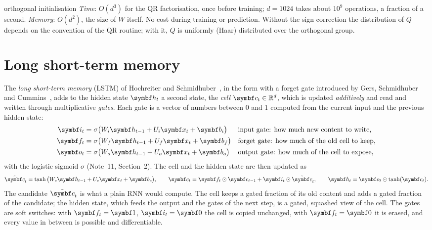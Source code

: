 \documentclass[11pt]{article}
\newcommand{\hv}{\vect{h}}
\newcommand{\bv}{\vect{b}}
\newcommand{\cv}{\vect{c}}
\newcommand{\iv}{\vect{i}}
\newcommand{\fv}{\vect{f}}
\newcommand{\ov}{\vect{o}}
\newcommand{\ctil}{\tilde{\vect{c}}}
\begin{document}
\begin{runtime}{orthogonal initialisation}
\emph{Time}: $O(d^3)$ for the QR factorisation, once before training; $d = 1024$ takes about $10^9$ operations, a fraction of
a second. \emph{Memory}: $O(d^2)$, the size of $W$ itself. No cost during training or prediction. Without the sign correction
the distribution of $Q$ depends on the convention of the QR routine; with it, $Q$ is uniformly (Haar) distributed over the
orthogonal group.
\end{runtime}

\section{Long short-term memory}\label{sec:lstm}

The \emph{long short-term memory} (LSTM) of Hochreiter and Schmidhuber~\cite{hochreiter1997}, in the form with a forget
gate introduced by Gers, Schmidhuber and Cummins~\cite{gers2000}, adds to the hidden state $\hv_t$ a second state, the
\emph{cell} $\cv_t \in \R^d$, which is updated \emph{additively} and read and written through multiplicative \emph{gates}.
Each gate is a vector of numbers between $0$ and $1$ computed from the current input and the previous hidden state:
\begin{equation}\label{eq:gates}
\begin{aligned}
  \iv_t &= \sigma\big(W_i\hv_{t-1} + U_i\x_t + \bv_i\big) && \text{input gate: how much new content to write,} \\
  \fv_t &= \sigma\big(W_f\hv_{t-1} + U_f\x_t + \bv_f\big) && \text{forget gate: how much of the old cell to keep,} \\
  \ov_t &= \sigma\big(W_o\hv_{t-1} + U_o\x_t + \bv_o\big) && \text{output gate: how much of the cell to expose,}
\end{aligned}
\end{equation}
with the logistic sigmoid $\sigma$ (Note~11, Section~2). The cell and the hidden state are then updated as
\begin{equation}\label{eq:cell}
  \ctil_t = \tanh\big(W_c\hv_{t-1} + U_c\x_t + \bv_c\big), \qquad
  \cv_t = \fv_t \odot \cv_{t-1} + \iv_t \odot \ctil_t, \qquad
  \hv_t = \ov_t \odot \tanh(\cv_t) .
\end{equation}
The candidate $\ctil_t$ is what a plain RNN would compute. The cell keeps a gated fraction of its old content and adds a
gated fraction of the candidate; the hidden state, which feeds the output and the gates of the next step, is a gated,
squashed view of the cell. The gates are soft switches: with $\fv_t = \vect{1}$, $\iv_t = \vect{0}$ the cell is copied
unchanged, with $\fv_t = \vect{0}$ it is erased, and every value in between is possible and differentiable.
\end{document}
